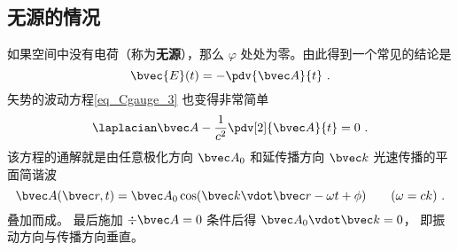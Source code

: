 \subsection{无源的情况}

如果空间中没有电荷（称为\textbf{无源}），那么 $\varphi$ 处处为零。由此得到一个常见的结论是
\begin{equation}\label{eq_Cgauge_2}
\bvec {E}(t) = -\pdv{\bvec A}{t}~.
\end{equation}
矢势的波动方程\autoref{eq_Cgauge_3} 也变得非常简单
\begin{equation}
\laplacian \bvec A - \frac{1}{c^2} \pdv[2]{\bvec A}{t} = 0~.
\end{equation}
该方程的通解就是由任意极化方向 $\bvec A_0$ 和延传播方向 $\bvec k$ 光速传播的平面简谐波
\begin{equation}
\bvec A(\bvec r, t) = \bvec A_0 \cos(\bvec k \vdot \bvec r - \omega t + \phi) \qquad (\omega = ck)~.
\end{equation}
叠加而成。 最后施加 $\div \bvec A = 0$ 条件后得 $\bvec A_0 \vdot \bvec k = 0$， 即振动方向与传播方向垂直。
